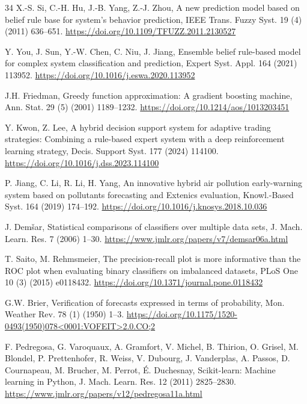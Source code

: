 \documentclass[preprint,12pt]{elsarticle}
\begin{document}
{\begin{thebibliography}{34}
X.-S. Si, C.-H. Hu, J.-B. Yang, Z.-J. Zhou, A new prediction model based on belief rule base for system's behavior prediction, IEEE Trans. Fuzzy Syst. 19 (4) (2011) 636--651. \newline\url{https://doi.org/10.1109/TFUZZ.2011.2130527}

Y. You, J. Sun, Y.-W. Chen, C. Niu, J. Jiang, Ensemble belief rule-based model for complex system classification and prediction, Expert Syst. Appl. 164 (2021) 113952. \newline\url{https://doi.org/10.1016/j.eswa.2020.113952}

J.H. Friedman, Greedy function approximation: A gradient boosting machine, Ann. Stat. 29 (5) (2001) 1189--1232. \newline\url{https://doi.org/10.1214/aos/1013203451}

Y. Kwon, Z. Lee, A hybrid decision support system for adaptive trading strategies: Combining a rule-based expert system with a deep reinforcement learning strategy, Decis. Support Syst. 177 (2024) 114100. \newline\url{https://doi.org/10.1016/j.dss.2023.114100}

P. Jiang, C. Li, R. Li, H. Yang, An innovative hybrid air pollution early-warning system based on pollutants forecasting and Extenics evaluation, Knowl.-Based Syst. 164 (2019) 174--192. \newline\url{https://doi.org/10.1016/j.knosys.2018.10.036}

J. Dem\v{s}ar, Statistical comparisons of classifiers over multiple data sets, J. Mach. Learn. Res. 7 (2006) 1--30. \newline\url{https://www.jmlr.org/papers/v7/demsar06a.html}

T. Saito, M. Rehmsmeier, The precision-recall plot is more informative than the ROC plot when evaluating binary classifiers on imbalanced datasets, PLoS One 10 (3) (2015) e0118432. \newline\url{https://doi.org/10.1371/journal.pone.0118432}

G.W. Brier, Verification of forecasts expressed in terms of probability, Mon. Weather Rev. 78 (1) (1950) 1--3. \newline\url{https://doi.org/10.1175/1520-0493(1950)078<0001:VOFEIT>2.0.CO;2}

F. Pedregosa, G. Varoquaux, A. Gramfort, V. Michel, B. Thirion, O. Grisel, M. Blondel, P. Prettenhofer, R. Weiss, V. Dubourg, J. Vanderplas, A. Passos, D. Cournapeau, M. Brucher, M. Perrot, \'E. Duchesnay, Scikit-learn: Machine learning in Python, J. Mach. Learn. Res. 12 (2011) 2825--2830. \newline\url{https://www.jmlr.org/papers/v12/pedregosa11a.html}

\end{thebibliography}
}
\end{document}
